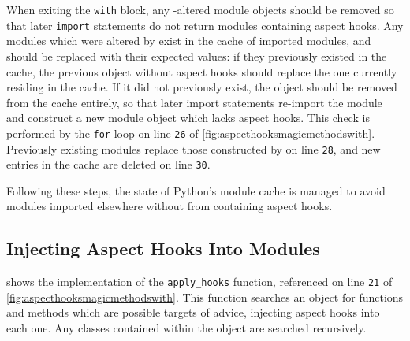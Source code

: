 When exiting the \lstinline{with} block, any \pdsfthree{}-altered module objects
should be removed so that later \lstinline{import} statements do not return
modules containing aspect hooks. Any modules which were altered by \pdsfthree{}
exist in the cache of imported modules, and should be replaced with their
expected values: if they previously existed in the cache, the previous object
without aspect hooks should replace the one currently residing in the cache. If
it did not previously exist, the object should be removed from the cache
entirely, so that later import statements re-import the module and construct a
new module object which lacks aspect hooks. This check is performed by the
\lstinline{for} loop on line \texttt{26} of
\cref{fig:aspecthooksmagicmethodswith}. Previously existing modules replace
those constructed by \pdsfthree{} on line \texttt{28}, and new entries in the
cache are deleted on line \texttt{30}.

Following these steps, the state of Python's module cache is managed to avoid
modules imported elsewhere without \pdsfthree{} from containing aspect hooks.

\subsection{Injecting Aspect Hooks Into Modules}
\label{injecting_aspect_hooks_when_importing}

 shows the implementation of the
\lstinline{apply_hooks} function, referenced on line \texttt{21} of
\cref{fig:aspecthooksmagicmethodswith}. This function searches an
object for functions and methods which are possible targets of advice, injecting
aspect hooks into each one. Any classes contained within the object are searched
recursively.

